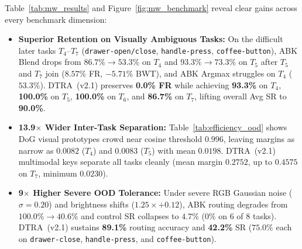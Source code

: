 \documentclass[10pt,twocolumn]{article}
\begin{document}
Table~\ref{tab:mw_results} and Figure~\ref{fig:mw_benchmark} reveal clear gains across every benchmark dimension:
\begin{itemize}[leftmargin=*,itemsep=2pt]
  \item \textbf{Superior Retention on Visually Ambiguous Tasks:} On the difficult later tasks $T_4$--$T_7$ (\texttt{drawer-open/close}, \texttt{handle-press}, \texttt{coffee-button}), ABK Blend drops from $86.7\% \to 53.3\%$ on $T_4$ and $93.3\% \to 73.3\%$ on $T_5$ after $T_5$ and $T_7$ join ($8.57\%$ FR, $-5.71\%$ BWT), and ABK Argmax struggles on $T_4$ ($53.3\%$). DTRA~(v2.1) preserves \textbf{0.0\% FR} while achieving \textbf{93.3\%} on $T_4$, \textbf{100.0\%} on $T_5$, \textbf{100.0\%} on $T_6$, and \textbf{86.7\%} on $T_7$, lifting overall Avg SR to \textbf{90.0\%}.
  \item \textbf{13.9$\times$ Wider Inter-Task Separation:} Table~\ref{tab:efficiency_ood} shows DoG visual prototypes crowd near cosine threshold $0.996$, leaving margins as narrow as $0.0082$ ($T_4$) and $0.0083$ ($T_5$) with mean $0.0198$. DTRA~(v2.1) multimodal keys separate all tasks cleanly (mean margin $0.2752$, up to $0.4575$ on $T_7$, minimum $0.0230$).
  \item \textbf{9$\times$ Higher Severe OOD Tolerance:} Under severe RGB Gaussian noise ($\sigma=0.20$) and brightness shifts ($1.25\times + 0.12$), ABK routing degrades from $100.0\% \to 40.6\%$ and control SR collapses to $4.7\%$ ($0\%$ on $6$ of $8$ tasks). DTRA~(v2.1) sustains \textbf{89.1\%} routing accuracy and \textbf{42.2\%} SR ($75.0\%$ each on \texttt{drawer-close}, \texttt{handle-press}, and \texttt{coffee-button}).
\end{itemize}

\begin{table}[t]
  \centering
  \caption{Latency scaling ($K=1\dots 8$), magnetic resonance margins, and 3D OOD stress test comparison ($n_{\text{ood}}=8$).}
  \label{tab:efficiency_ood}
  \small
\end{table}
\end{document}
